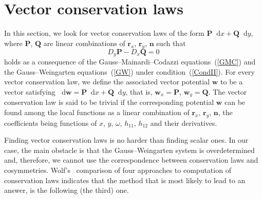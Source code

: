 \documentclass[pdftex]{sigma}
\let\ve\mathbf
\def\h#1#2{h_{#1#2}}
\def\f{\omega}
\def\eqref#1{{\rm(\ref{#1})}}
\numberwithin{equation}{section}
\def\dif{\mathop{}\!\mathrm d}
\begin{document}
\section{Vector conservation laws}\label{sect:vcl}

In this section, we look for vector conservation laws of the form
$\ve P \dif x + \ve Q \dif y$, where
$\ve P$, $\ve Q$ are linear combinations of $\ve r_x$, $\ve r_y$, $\ve n$ such that
\[
D_y \ve P - D_x \ve Q = 0
\]
holds as a consequence of the Gauss--Mainardi--Codazzi
equations~\eqref{GMC} and the Gauss--Wein\-gar\-ten equations~\eqref{GW}
under condition~\eqref{CondII}.
For every vector conservation law, we define the associated vector potential
$\ve w$ to be a vector satisfying
$\dif \ve w = \ve P \dif x + \ve Q \dif y$, that is,
$\ve w_x = \ve P$, $\ve w_y = \ve Q$.
The vector conservation law is said to be trivial if the corresponding
potential $\ve w$ can be found among the local functions as a
linear combination of $\ve r_x$, $\ve r_y$, $\ve n$, the coefficients being functions
of $x$, $y$, $\f$, $\h11$, $\h12$ and their derivatives.

Finding vector conservation laws is no harder than finding scalar ones.
In our case, the main obstacle is that the Gauss--Weingarten system is overdetermined
and, therefore,
we cannot use the correspondence between conservation laws and cosymmetries.
Wolf's~\cite{Wolf} comparison of four approaches to computation of
conservation laws indicates that the method that is most likely to lead to
an answer, is the following (the third) one.
\end{document}
